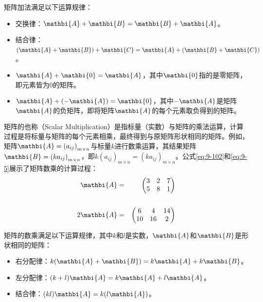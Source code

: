 \parinterval 矩阵加法满足以下运算规律：

\begin{itemize}
\vspace{0.5em}
\item 交换律：$ {\mathbi{A}}+{\mathbi{B}} = {\mathbi{B}} +{\mathbi{A}} $。
\vspace{0.5em}
\item 结合律：$ ({\mathbi{A}}+{\mathbi{B}})+{\mathbi{C}}= {\mathbi{A}}+({\mathbi{B}}+{\mathbi{C}}) $。
\vspace{0.5em}
\item $ {\mathbi{A}}+{\mathbi{0}}={\mathbi{A}} $，其中$ {\mathbi{0}} $指的是零矩阵，即元素皆为0的矩阵。
\vspace{0.5em}
\item $ {\mathbi{A}}+(-{\mathbi{A}})={\mathbi{0}} $，其中$ -{\mathbi{A}} $是矩阵$ {\mathbi{A}} $的负矩阵，即将矩阵$ {\mathbi{A}} $的每个元素取负得到的矩阵。
\vspace{0.5em}
\end{itemize}

\parinterval 矩阵的{\small{}}也称{\small{}}（Scalar Multiplication）是指标量（实数）与矩阵的乘法运算，计算过程是将标量与矩阵的每个元素相乘，最终得到与原矩阵形状相同的矩阵。例如，矩阵$ {\mathbi{A}}={(a_{ij})}_{m\times n} $与标量$ k $进行数乘运算，其结果矩阵$ {\mathbi{B}}={(ka_{ij})}_{m\times n} $，即$ k{(a_{ij})}_{m\times n}={(ka_{ij})}_{m\times n} $。公式\eqref{eq:9-102}和\eqref{eq:9-5}展示了矩阵数乘的计算过程：
\begin{eqnarray}
{\mathbi{A}} & = &
\begin{pmatrix}
   3 & 2 & 7\\
   5 & 8 & 1
\end{pmatrix}
\label{eq:9-102}
\\ \nonumber \\
2{\mathbi{A}} & = &
\begin{pmatrix}
   6 & 4 & 14\\
   10 & 16 & 2
\end{pmatrix}
\label{eq:9-5}
\end{eqnarray}

\parinterval 矩阵的数乘满足以下运算规律，其中$ k $和$ l $是实数，$ {\mathbi{A}} $和$ {\mathbi{B}} $是形状相同的矩阵：

\begin{itemize}
\vspace{0.5em}
\item 右分配律：$ k({\mathbi{A}}+{\mathbi{B}})=k{\mathbi{A}}+k{\mathbi{B}} $。
\vspace{0.5em}
\item 左分配律：$ (k+l){\mathbi{A}}=k{\mathbi{A}}+l{\mathbi{A}}$。
\vspace{0.5em}
\item 结合律：$ (kl){\mathbi{A}}=k(l{\mathbi{A}}) $。
\end{itemize}

